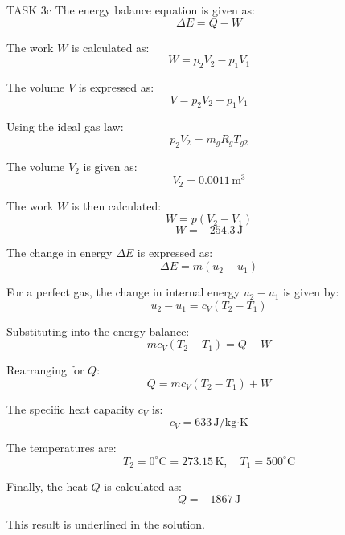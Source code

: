 TASK 3c  
The energy balance equation is given as:  
\[
\Delta E = Q - W
\]  

The work \( W \) is calculated as:  
\[
W = p_2 V_2 - p_1 V_1
\]  

The volume \( V \) is expressed as:  
\[
V = p_2 V_2 - p_1 V_1
\]  

Using the ideal gas law:  
\[
p_2 V_2 = m_g R_g T_{g2}
\]  

The volume \( V_2 \) is given as:  
\[
V_2 = 0.0011 \, \text{m}^3
\]  

The work \( W \) is then calculated:  
\[
W = p(V_2 - V_1)
\]  
\[
W = -254.3 \, \text{J}
\]  

The change in energy \( \Delta E \) is expressed as:  
\[
\Delta E = m(u_2 - u_1)
\]  

For a perfect gas, the change in internal energy \( u_2 - u_1 \) is given by:  
\[
u_2 - u_1 = c_V (T_2 - T_1)
\]  

Substituting into the energy balance:  
\[
m c_V (T_2 - T_1) = Q - W
\]  

Rearranging for \( Q \):  
\[
Q = m c_V (T_2 - T_1) + W
\]  

The specific heat capacity \( c_V \) is:  
\[
c_V = 633 \, \text{J/kg·K}
\]  

The temperatures are:  
\[
T_2 = 0^\circ\text{C} = 273.15 \, \text{K}, \quad T_1 = 500^\circ\text{C}
\]  

Finally, the heat \( Q \) is calculated as:  
\[
Q = -1867 \, \text{J}
\]  

This result is underlined in the solution.